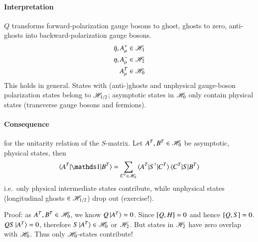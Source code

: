 \paragraph{Interpretation}
$Q$ transforms forward-polarization gauge bosons to ghost, ghosts to zero, anti-ghosts into backward-polarization gauge bosons.
\begin{align*}
   \bar{\eta}, A^+_\mu &\in \mathscr{H}_1 \\ 
 \eta, A^-_\mu &\in \mathscr{H}_2 \\ 
 A_\mu^T &\in \mathscr{H}_0
\end{align*}
This holds in general. States with (anti-)ghosts and unphysical gauge-boson polarization states belong to $\mathscr{H}_{1/2}$; asymptotic states in $\mathscr{H}_0$ only contain physical states (transverse gauge bosons and fermions).

\paragraph{Consequence} for the unitarity relation of the $S$-matrix. Let $A^T, B^T \in \mathscr{H}_0$ be asymptotic, physical states, then
\begin{align*}
   \braket{ A^T | \id | B^T} = \sum_{C^T \in \hil_0} \braket{A^T| S^\dagger | C^T} \braket{C^T | S | B^T} 
\end{align*}
i.e.~only physical intermediate states contribute, while unphysical states (longitudinal ghosts $\in \mathscr{H}_{1/2}$) drop out (exercise!).

Proof: as $A^T, B^T \in \mathscr{H}_0$, we know $Q \ket{A^T} = 0$. Since $\comm{Q}{H} = 0$ and hence $\comm{Q}{S} = 0$.
$Q S \ket{A^T} = 0$, therefore $S \ket{A^T} \in \mathscr{H}_0$ or $\mathscr{H}_2$. But states in $\mathscr{H}_2$ have zero overlap with $\mathscr{H}_0$. Thus only $\mathscr{H}_0$-states contribute!
